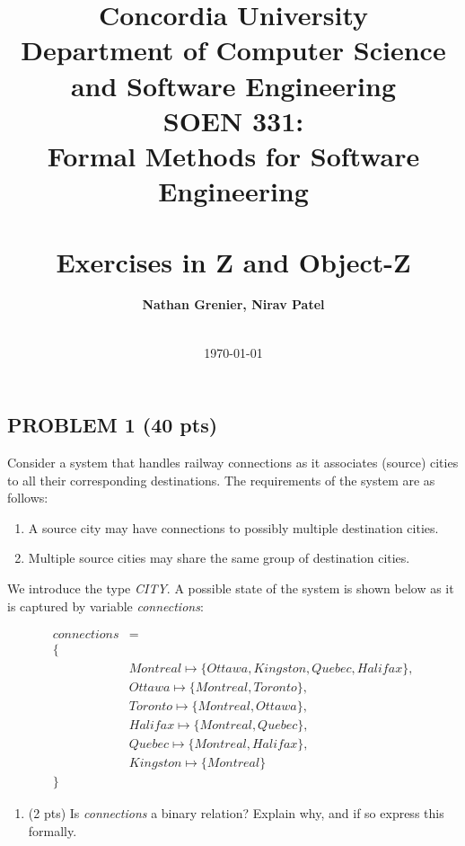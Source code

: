\documentclass[12pt]{article}
\title{Concordia University\\
Department of Computer Science and Software Engineering\\
\textbf{SOEN 331:\\Formal Methods for Software Engineering}\\
\ \\
\textbf{Exercises in Z and Object-Z}}
\author{\textbf{Nathan Grenier, Nirav Patel}\\
\ \\}
\date{\today}
\begin{document}
\begin{spacing}{1.5}
		
	\maketitle
		
	\newpage
		
	\section*{PROBLEM 1 (40 pts)}
		
	Consider a system that handles railway connections as it associates (source) cities to all their corresponding destinations. The requirements of the system are as follows:
		
	\begin{enumerate}
		\item A source city may have connections to possibly multiple destination cities.
		\item Multiple source cities may share the same group of destination cities.
	\end{enumerate}
		
	We introduce the type \textit{CITY}. A possible state of the system is shown below as it is captured by variable \textit{connections}:
		
	\begin{align*}
		connections & =                                                       \\
		\{ \\
		            & Montreal \mapsto \{Ottawa, Kingston, Quebec, Halifax\}, \\
		            & Ottawa \mapsto \{Montreal, Toronto\},                   \\
		            & Toronto \mapsto \{Montreal, Ottawa\},                   \\
		            & Halifax \mapsto \{Montreal, Quebec\},                   \\
		            & Quebec \mapsto \{Montreal, Halifax\},                   \\
		            & Kingston \mapsto \{Montreal\}                           \\
		\}
	\end{align*}
		
	\begin{enumerate}
		\item (2 pts) Is \textit{connections} a binary relation? Explain why, and if so express this formally.
		              

\end{enumerate}
\end{spacing}
\end{document}
